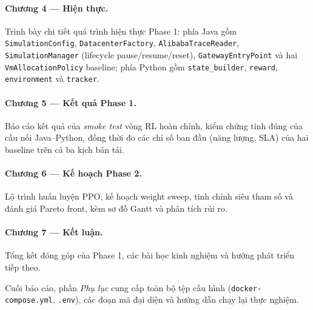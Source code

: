 \paragraph{Chương 4 --- Hiện thực.}
Trình bày chi tiết quá trình hiện thực Phase 1: phía Java gồm
\texttt{SimulationConfig}, \texttt{DatacenterFactory},
\texttt{AlibabaTraceReader}, \texttt{SimulationManager} (lifecycle
pause/resume/reset), \texttt{GatewayEntryPoint} và hai
\texttt{VmAllocationPolicy} baseline; phía Python gồm
\texttt{state\_builder}, \texttt{reward}, \texttt{environment} và
\texttt{tracker}.

\paragraph{Chương 5 --- Kết quả Phase 1.}
Báo cáo kết quả của \textit{smoke test} vòng RL hoàn chỉnh, kiểm chứng
tính đúng của cầu nối Java--Python, đồng thời đo các chỉ số ban đầu
(năng lượng, SLA) của hai baseline trên cả ba kịch bản tải.

\paragraph{Chương 6 --- Kế hoạch Phase 2.}
Lộ trình huấn luyện PPO, kế hoạch weight sweep, tinh chỉnh siêu tham số
và đánh giá Pareto front, kèm sơ đồ Gantt và phân tích rủi ro.

\paragraph{Chương 7 --- Kết luận.}
Tổng kết đóng góp của Phase 1, các bài học kinh nghiệm và hướng phát
triển tiếp theo.

Cuối báo cáo, phần \textit{Phụ lục} cung cấp toàn bộ tệp cấu hình
(\texttt{docker-compose.yml}, \texttt{.env}), các đoạn mã đại diện và
hướng dẫn chạy lại thực nghiệm.
